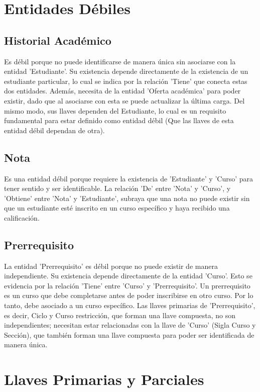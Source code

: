 \documentclass[12pt]{article}
\begin{document}
\section*{Entidades Débiles}
\subsection*{Historial Académico}
Es débil porque no puede identificarse de manera única sin asociarse con la entidad 'Estudiante'. 
Su existencia depende directamente de la existencia de un estudiante particular, lo cual se indica por la relación 'Tiene' 
que conecta estas dos entidades. Además, necesita de la entidad 'Oferta académica' 
para poder existir, dado que al asociarse con esta se puede actualizar la última carga. Del mismo modo, sus llaves dependen del Estudiante, lo cual es un requisito fundamental para estar definido como entidad débil 
(Que las llaves de esta entidad débil dependan de otra). 

\subsection*{Nota}
Es una entidad débil porque requiere la existencia de 'Estudiante' y 'Curso' 
para tener sentido y ser identificable. La relación 'De' entre 'Nota' y 'Curso', y 'Obtiene' entre 'Nota' y 'Estudiante', 
subraya que una nota no puede existir sin que un estudiante esté inscrito en un curso específico y haya recibido una calificación. 

\subsection*{Prerrequisito}
La entidad 'Prerrequisito' es débil porque no puede existir de manera independiente. 
Su existencia depende directamente de la entidad 'Curso'. Esto se evidencia por la relación 'Tiene' entre 'Curso' y 'Prerrequisito'. 
Un prerrequisito es un curso que debe completarse antes de poder inscribirse en otro curso. Por lo tanto, debe asociado a 
un curso específico. Las llaves primarias de 'Prerrequisito', es decir, Ciclo y Curso restricción, que forman una llave compuesta, no son independientes; 
necesitan estar relacionadas con la llave de 'Curso' (Sigla Curso y Sección), que también forman una llave compuesta 
para poder ser identificada de manera única.  

\newpage
\section*{Llaves Primarias y Parciales}
\end{document}
